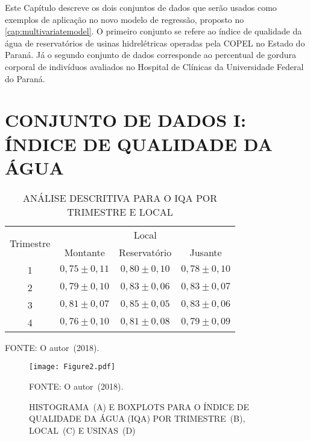 
Este Capítulo descreve os dois conjuntos de dados que serão usados como
exemplos de aplicação no novo modelo de regressão, proposto no
\autoref{cap:multivariatemodel}. O primeiro conjunto se refere ao índice
de qualidade da água de reservatórios de usinas hidrelétricas operadas
pela COPEL no Estado do Paraná. Já o segundo conjunto de dados
corresponde ao percentual de gordura corporal de indivíduos avaliados no
Hospital de Clínicas da Universidade Federal do Paraná.

\section{CONJUNTO DE DADOS I: ÍNDICE DE QUALIDADE DA ÁGUA}
\label{cap:IQA}

\begin{table}[H]
  \centering
  \setlength{\abovecaptionskip}{.0001pt}
  \caption{ANÁLISE DESCRITIVA PARA O IQA POR TRIMESTRE E LOCAL}
  \label{tab:descIQA}
  \begin{tabular}{cccc}
    \hline
    \multirow{2}{*}{Trimestre} & \multicolumn{3}{c}{Local} \\
    \cline{2-4}  & Montante & Reservatório & Jusante \\
    \cline{2-4} 1   & $0,75\pm 0,11$   &  $0,80\pm 0,10$  &  $0,78\pm 0,10$  \\
    2  &  $0,79\pm 0,10$  &  $0,83\pm 0,06$   &  $0,83\pm 0,07$     \\
    3   &  $0,81\pm 0,07$   & $0,85\pm 0,05$   &  $0,83\pm 0,06$    \\
    4   & $0,76\pm 0,10$    &  $0,81\pm 0,08$    &  $0,79\pm 0,09$    \\
    \hline
  \end{tabular}
  \begin{footnotesize}
    \vspace{0.05cm}
    FONTE: O autor~(2018). \hspace{6.2cm}
    \vspace{-0.15cm}
  \end{footnotesize}
\end{table}

\vspace{-0.2cm}

\begin{figure}[H]
  \vspace{0.35cm}
  \setlength{\abovecaptionskip}{.0001pt}
  \caption{HISTOGRAMA~(A) E BOXPLOTS PARA O ÍNDICE DE QUALIDADE DA ÁGUA
    (IQA) POR TRIMESTRE~(B), LOCAL~(C) E USINAS~(D)}
  \texttt{[image: Figure2.pdf]}
  \begin{footnotesize}
    \vspace{-0.20cm}
    \centering
    FONTE: O autor~(2018).
    \vspace{0.15cm}
  \end{footnotesize}
  \label{fig:iqa1}
\end{figure}

